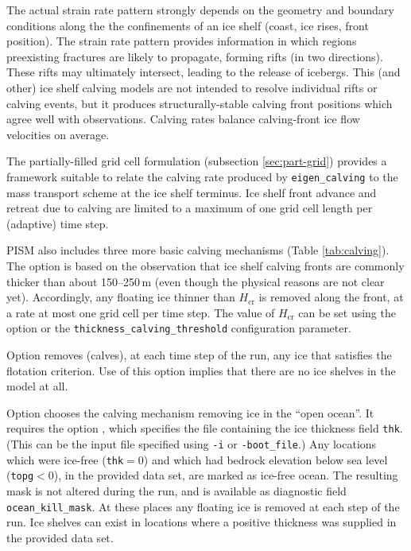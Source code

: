 The actual strain rate pattern strongly depends on the geometry and boundary conditions along the the confinements of an ice shelf (coast, ice rises, front position).  The strain rate pattern provides information in which regions preexisting fractures are likely to propagate, forming rifts (in two directions).  These rifts may ultimately intersect, leading to the release of icebergs.  This (and other) ice shelf calving models are not intended to resolve individual rifts or calving events, but it produces structurally-stable calving front positions which agree well with observations.  Calving rates balance calving-front ice flow velocities on average.

The partially-filled grid cell formulation (subsection \ref{sec:part-grid}) provides a framework suitable to relate the calving rate produced by \texttt{eigen_calving} to the mass transport scheme at the ice shelf terminus.  Ice shelf front advance and retreat due to calving are limited to a maximum of one grid cell length per (adaptive) time step.

PISM also includes three more basic calving mechanisms (Table \ref{tab:calving}). The option  is based on the observation that ice shelf calving fronts are commonly thicker than about 150--250\,m (even though the physical reasons are not clear yet). Accordingly, any floating ice thinner than $H_{\textrm{cr}}$ is removed along the front, at a rate at most one grid cell per time step. The value of $H_{\mathrm{cr}}$ can be set using the  option or the \texttt{thickness_calving_threshold} configuration parameter.

Option  removes (calves), at each time step of the run, any ice that satisfies the flotation criterion.  Use of this option implies that there are no ice shelves in the model at all.

Option  chooses the calving mechanism removing ice in the ``open ocean''. It requires the option , which specifies the file containing the ice thickness field \texttt{thk}. (This can be the input file specified using \texttt{-i} or \texttt{-boot_file}.) Any locations which were ice-free (\texttt{thk}$=0$) and which had bedrock elevation below sea level (\texttt{topg}$<0$), in the provided data set, are marked as ice-free ocean.  The resulting mask is not altered during the run, and is available as diagnostic field \texttt{ocean_kill_mask}.  At these places any floating ice is removed at each step of the run.  Ice shelves can exist in locations where a positive thickness was supplied in the provided data set.

